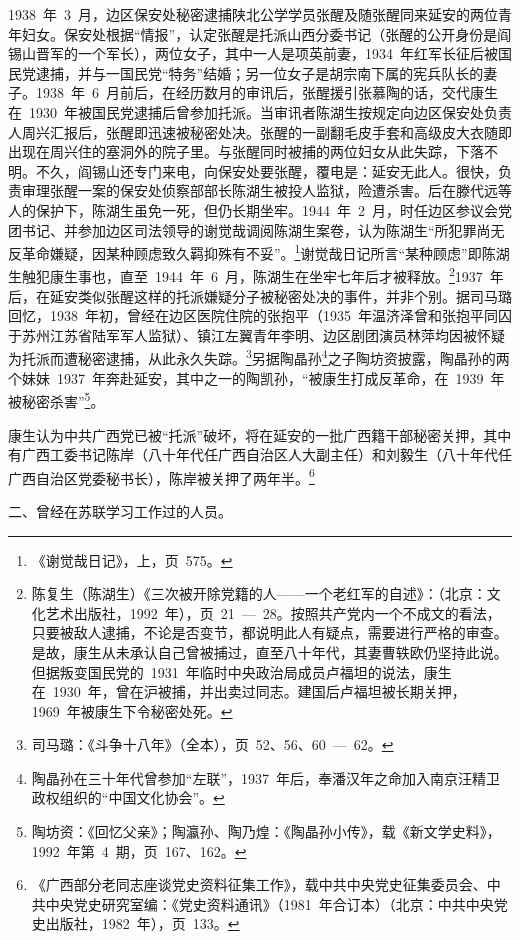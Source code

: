 1938~年~3~月，边区保安处秘密逮捕陕北公学学员张醒及随张醒同来延安的两位青年妇女。保安处根据“情报”，认定张醒是托派山西分委书记（张醒的公开身份是阎锡山晋军的一个军长），两位女子，其中一人是项英前妻，1934~年红军长征后被国民党逮捕，并与一国民党“特务”结婚；另一位女子是胡宗南下属的宪兵队长的妻子。1938~年~6~月前后，在经历数月的审讯后，张醒援引张慕陶的话，交代康生在~1930~年被国民党逮捕后曾参加托派。当审讯者陈湖生按规定向边区保安处负责人周兴汇报后，张醒即迅速被秘密处决。张醒的一副翻毛皮手套和高级皮大衣随即出现在周兴住的塞洞外的院子里。与张醒同时被捕的两位妇女从此失踪，下落不明。不久，阎锡山还专门来电，向保安处要张醒，覆电是：延安无此人。很快，负责审理张醒一案的保安处侦察部部长陈湖生被投人监狱，险遭杀害。后在滕代远等人的保护下，陈湖生虽免一死，但仍长期坐牢。1944~年~2~月，时任边区参议会党团书记、并参加边区司法领导的谢觉哉调阅陈湖生案卷，认为陈湖生“所犯罪尚无反革命嫌疑，因某种顾虑致久羁抑殊有不妥”。\footnote{《谢觉哉日记》，上，页~575。}谢觉哉日记所言“某种顾虑”即陈湖生触犯康生事也，直至~1944~年~6~月，陈湖生在坐牢七年后才被释放。\footnote{陈复生（陈湖生）《三次被开除党籍的人——一个老红军的自述》：（北京：文化艺术出版社，1992~年），页~21~—~28。按照共产党内一个不成文的看法，只要被敌人逮捕，不论是否变节，都说明此人有疑点，需要进行严格的审查。是故，康生从未承认自己曾被捕过，直至八十年代，其妻曹轶欧仍坚持此说。但据叛变国民党的~1931~年临时中央政治局成员卢福坦的说法，康生在~1930~年，曾在沪被捕，并出卖过同志。建国后卢福坦被长期关押，1969~年被康生下令秘密处死。}1937~年后，在延安类似张醒这样的托派嫌疑分子被秘密处决的事件，并非个别。据司马璐回忆，1938~年初，曾经在边区医院住院的张抱平（1935~年温济泽曾和张抱平同囚于苏州江苏省陆军军人监狱）、镇江左翼青年李明、边区剧团演员林萍均因被怀疑为托派而遭秘密逮捕，从此永久失踪。\footnote{司马璐：《斗争十八年》（全本），页~52、56、60~—~62。}另据陶晶孙\footnote{陶晶孙在三十年代曾参加“左联”，1937~年后，奉潘汉年之命加入南京汪精卫政权组织的“中国文化协会”。}之子陶坊资披露，陶晶孙的两个妹妹~1937~年奔赴延安，其中之一的陶凯孙，“被康生打成反革命，在~1939~年被秘密杀害”\footnote{陶坊资：《回忆父亲》；陶瀛孙、陶乃煌：《陶晶孙小传》，载《新文学史料》，1992~年第~4~期，页~167、162。}。

康生认为中共广西党已被“托派”破坏，将在延安的一批广西籍干部秘密关押，其中有广西工委书记陈岸（八十年代任广西自治区人大副主任）和刘毅生（八十年代任广西自治区党委秘书长），陈岸被关押了两年半。\footnote{《广西部分老同志座谈党史资料征集工作》，载中共中央党史征集委员会、中共中央党史研究室编：《党史资料通讯》（1981~年合订本）（北京：中共中央党史出版社，1982~年），页~133。}

二、曾经在苏联学习工作过的人员。

